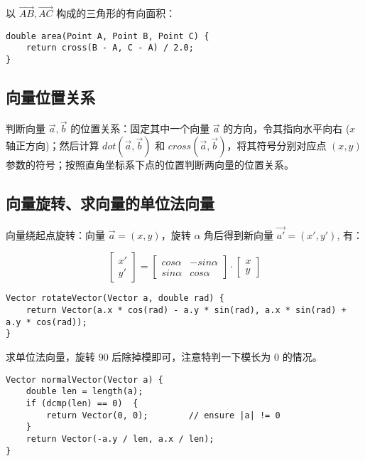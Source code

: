 \par 以 $\vec{AB}, \vec{AC}$ 构成的三角形的有向面积：

\begin{verbatim}
double area(Point A, Point B, Point C) {
    return cross(B - A, C - A) / 2.0;
}
\end{verbatim}

\subsection{向量位置关系}

判断向量 $\vec{a}, \vec{b}$ 的位置关系：固定其中一个向量 $\vec{a}$ 的方向，令其指向水平向右 ($x$ 轴正方向)；然后计算 $dot(\vec{a}, \vec{b})$ 和 $cross(\vec{a}, \vec{b})$，将其符号分别对应点 $(x, y)$ 参数的符号；按照直角坐标系下点的位置判断两向量的位置关系。

\subsection{向量旋转、求向量的单位法向量}
\par 向量绕起点旋转：向量 $\vec{a} = (x, y)$，旋转 $\alpha$ 角后得到新向量 $\vec{a'} = (x', y')$, 有：

$$\begin{bmatrix}x' \\ y'\end{bmatrix} = \begin{bmatrix}cos\alpha & -sin\alpha \\ sin\alpha & cos\alpha \end{bmatrix} \cdot \begin{bmatrix}x \\ y\end{bmatrix}$$

\begin{verbatim}
Vector rotateVector(Vector a, double rad) {
    return Vector(a.x * cos(rad) - a.y * sin(rad), a.x * sin(rad) + a.y * cos(rad));
}
\end{verbatim}

\par 求单位法向量，旋转 90 后除掉模即可，注意特判一下模长为 0 的情况。

\begin{verbatim}
Vector normalVector(Vector a) {
    double len = length(a);
    if (dcmp(len) == 0)  {
        return Vector(0, 0);        // ensure |a| != 0
    }
    return Vector(-a.y / len, a.x / len);
}
\end{verbatim}

